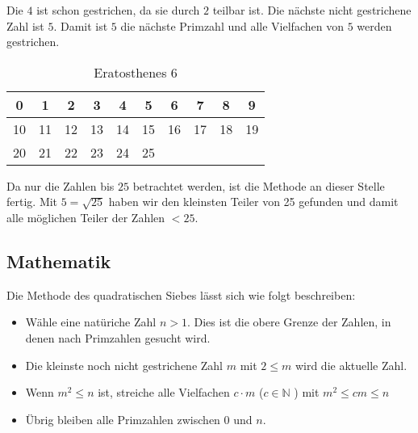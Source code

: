 	Die $4$ ist schon gestrichen, da sie durch $2$ teilbar ist. Die n\"achste nicht gestrichene Zahl ist $5$. Damit ist $5$ die n\"achste Primzahl und alle Vielfachen von $5$ werden gestrichen.
	
	\begin{table}[!ht] 
		\centering
		\begin{tabular}{|c|c|c|c|c|c|c|c|c|c|}
			\hline	 		 			
			\cellcolor{red}0  & \cellcolor{red} 1 &  \cellcolor{green}2 &  \cellcolor{green}3 & \cellcolor{red}4 &  \cellcolor{green}5 & \cellcolor{red} 6 &  \cellcolor{green}7 & \cellcolor{red} 8 &  \cellcolor{red}9 \\
			\hline
			\cellcolor{red}10 & \cellcolor{green}11 & \cellcolor{red}12 & \cellcolor{green}13 & \cellcolor{red}14 & \cellcolor{red}15 & \cellcolor{red}16 & \cellcolor{green}17 & \cellcolor{red}18 & \cellcolor{green}19 \\
			\hline
			\cellcolor{red}20 & \cellcolor{red}21 & \cellcolor{red}22 & \cellcolor{green}23 & \cellcolor{red}24 & \cellcolor{red}25 &  &  &  &  \\
			\hline
		\end{tabular}
		\caption{Eratosthenes 6}
		\label{tab:eratosthenes6}			
	\end{table}
	
	Da nur die Zahlen bis $25$ betrachtet werden, ist die Methode an dieser Stelle fertig. Mit $5=\sqrt{25}$ haben wir den kleinsten Teiler von 25 gefunden und damit alle m\"oglichen Teiler der Zahlen $<25$. 
	
	\subsection{Mathematik}
	Die Methode des quadratischen Siebes l\"asst sich wie folgt beschreiben:
	\begin{itemize}
		
		\item W\"ahle eine nat\"uriche Zahl $n > 1$. Dies ist die obere Grenze der Zahlen, in denen nach Primzahlen gesucht wird.
		\item Die kleinste noch nicht gestrichene Zahl $m$ mit $2 \leq m$ wird die aktuelle Zahl.
		\item Wenn $m^2 \leq n$ ist, streiche alle Vielfachen $c\cdot m$ ($c \in \mathbb{N} $ ) mit $m^2 \leq cm \leq n$
		\item \"Ubrig bleiben alle Primzahlen zwischen $0$ und $n$. 
	\end{itemize}